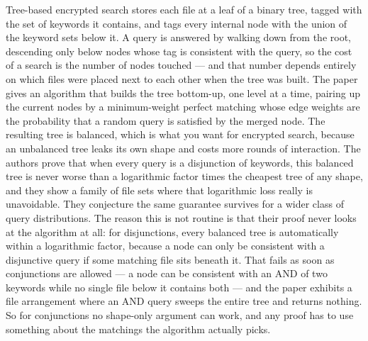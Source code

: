 \documentclass{conjura-conjecture}
\begin{document}

\vspace{0.4em}

\begin{informalconjecture}
Tree-based encrypted search stores each file at a leaf of a binary tree,
tagged with the set of keywords it contains, and tags every internal node
with the union of the keyword sets below it. A query is answered by walking
down from the root, descending only below nodes whose tag is consistent
with the query, so the cost of a search is the number of nodes touched ---
and that number depends entirely on which files were placed next to each
other when the tree was built. The paper gives an algorithm that builds the
tree bottom-up, one level at a time, pairing up the current nodes by a
minimum-weight perfect matching whose edge weights are the probability that
a random query is satisfied by the merged node. The resulting tree is
balanced, which is what you want for encrypted search, because an
unbalanced tree leaks its own shape and costs more rounds of interaction.
The authors prove that when every query is a disjunction of keywords, this
balanced tree is never worse than a logarithmic factor times the cheapest
tree of any shape, and they show a family of file sets where that
logarithmic loss really is unavoidable. They conjecture the same guarantee
survives for a wider class of query distributions. The reason this is not
routine is that their proof never looks at the algorithm at all: for
disjunctions, every balanced tree is automatically within a logarithmic
factor, because a node can only be consistent with a disjunctive query if
some matching file sits beneath it. That fails as soon as conjunctions are
allowed --- a node can be consistent with an AND of two keywords while no
single file below it contains both --- and the paper exhibits a file
arrangement where an AND query sweeps the entire tree and returns nothing.
So for conjunctions no shape-only argument can work, and any proof has to
use something about the matchings the algorithm actually picks.
\end{informalconjecture}
\end{document}
